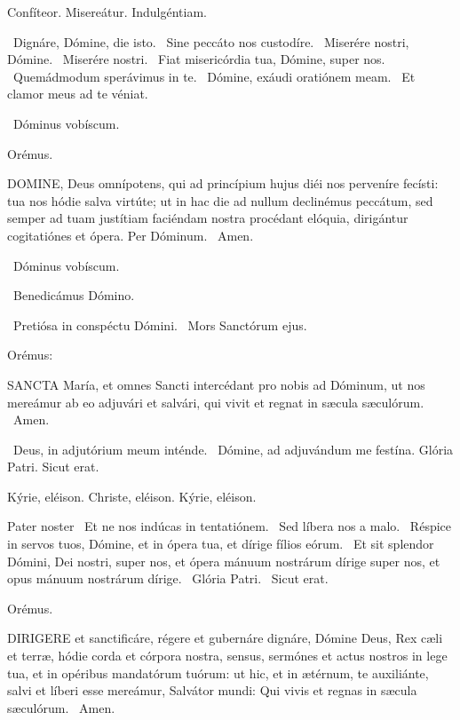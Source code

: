 Confíteor. Misereátur. Indulgéntiam.

\V\ Dignáre, Dómine, die isto. \R\ Sine peccáto nos custodíre. \V\ Miserére nostri, Dómine. \R\ Miserére nostri. \V\ Fiat misericórdia tua, Dómine, super nos. \R\ Quemádmodum sperávimus in te. \V\ Dómine, exáudi oratiónem meam. \R\ Et clamor meus ad te véniat.

\V\ Dóminus vobíscum.

Orémus. 

\lettrine[lines=2]{D}{OMINE}, Deus omnípotens, qui ad princípium hujus diéi nos perveníre fecísti: tua nos hódie salva virtúte; ut in hac die ad nullum declinémus peccátum, sed semper ad tuam justítiam faciéndam nostra procédant elóquia, dirigántur cogitatiónes et ópera. Per Dóminum. \R\ Amen.

\V\ Dóminus vobíscum.

\V\ Benedicámus Dómino.


\V\ Pretiósa in conspéctu Dómini. \R\ Mors Sanctórum ejus.

 Orémus:


\lettrine[lines=2]{S}{ANCTA} María, et omnes Sancti intercédant pro nobis ad Dóminum, ut nos mereámur ab eo adjuvári et salvári, qui vivit et regnat in sæcula sæculórum. \R\ Amen.

\V\ Deus, in adjutórium meum inténde. \R\ Dómine, ad adjuvándum me festína.  Glória Patri. Sicut erat.

Kýrie, eléison. Christe, eléison. Kýrie, eléison.

Pater noster  \V\ Et ne nos indúcas in tentatiónem. \R\ Sed líbera nos a malo. \V\ Réspice in servos tuos, Dómine, et in ópera tua, et dírige fílios eórum. \R\ Et sit splendor Dómini, Dei nostri, super nos, et ópera mánuum nostrárum dírige super nos, et opus mánuum nostrárum dírige. \V\ Glória Patri. \R\ Sicut erat.

Orémus. 

\lettrine[lines=2]{D}{IRIGERE} et sanctificáre, régere et gubernáre dignáre, Dómine Deus, Rex cæli et terræ, hódie corda et córpora nostra, sensus, sermónes et actus nostros in lege tua, et in opéribus mandatórum tuórum: ut hic, et in ætérnum, te auxiliánte, salvi et líberi esse mereámur, Salvátor mundi: Qui vivis et regnas in sæcula sæculórum. \R\ Amen.

